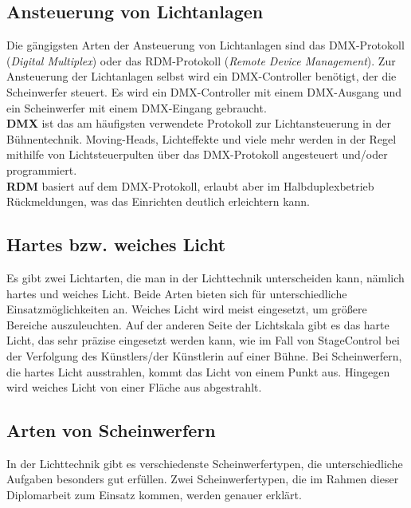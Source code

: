 \subsection{Ansteuerung von Lichtanlagen}
Die gängigsten Arten der Ansteuerung von Lichtanlagen sind das DMX-Protokoll (\emph{Digital Multiplex}) oder das RDM-Protokoll (\emph{Remote Device Management}). Zur Ansteuerung der Lichtanlagen selbst wird ein DMX-Controller benötigt, der die Scheinwerfer steuert. Es wird ein DMX-Controller mit einem DMX-Ausgang und ein Scheinwerfer mit einem DMX-Eingang gebraucht.\\
\textbf{DMX} ist das am häufigsten verwendete Protokoll zur Lichtansteuerung in der Bühnentechnik. Moving-Heads, Lichteffekte und viele mehr werden in der Regel mithilfe von Lichtsteuerpulten über das DMX-Protokoll angesteuert und/oder programmiert.\\
\textbf{RDM} basiert auf dem DMX-Protokoll, erlaubt aber im Halbduplexbetrieb Rückmeldungen, was das Einrichten deutlich erleichtern kann.\\
\cite{Lichtanlage_RDM_DMX}

\subsection{Hartes bzw. weiches Licht}
Es gibt zwei Lichtarten, die man in der Lichttechnik unterscheiden kann, nämlich hartes und weiches Licht. Beide Arten bieten sich für unterschiedliche Einsatzmöglichkeiten an. Weiches Licht wird meist eingesetzt, um größere Bereiche auszuleuchten. Auf der anderen Seite der Lichtskala gibt es das harte Licht, das sehr präzise eingesetzt werden kann, wie im Fall von StageControl bei der Verfolgung des Künstlers/der Künstlerin auf einer Bühne. Bei Scheinwerfern, die hartes Licht ausstrahlen, kommt das Licht von einem Punkt aus. Hingegen wird weiches Licht von einer Fläche aus abgestrahlt.\\
\cite{Hartes_Weiches_Licht}

\subsection{Arten von Scheinwerfern}
In der Lichttechnik gibt es verschiedenste Scheinwerfertypen, die unterschiedliche Aufgaben besonders gut erfüllen. Zwei Scheinwerfertypen, die im Rahmen dieser Diplomarbeit zum Einsatz kommen, werden genauer erklärt.

